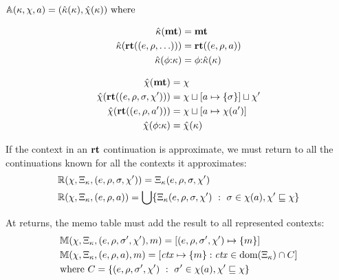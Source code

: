 \newcommand{\replacectx}{\hat\mkont} %
\newcommand{\addstore}{\hat\mmktab} %
\begin{center}
  $\approximate(\mkont, \mmktab, \maddr) = (\replacectx(\mkont), \addstore(\mkont)) \text{ where}$\\
  \begin{minipage}{0.45\linewidth}
    \begin{align*}
      \replacectx(\kmt) &= \kmt \\
      \replacectx(\krt{(\mexpr,\menv,\ldots)}) &= \krt{(\mexpr,\menv,\maddr)} \\
      \replacectx(\kcons{\mkframe}{\mkont}) &=
      \kcons{\mkframe}{\replacectx(\mkont)}
    \end{align*}
  \end{minipage}
  \begin{minipage}{0.50\linewidth}
    \begin{align*}
      \addstore(\kmt) &= \mmktab \\
      \addstore(\krt{(\mexpr,\menv,\mstore,\mmktab')}) &= \joinone{\mmktab}{\maddr}{\mstore}\sqcup \mmktab' \\
      \addstore(\krt{(\mexpr,\menv,\maddr')}) &= \joinm{\mmktab}{\maddr}{\mmktab(\maddr')} \\
      \addstore(\kcons{\mkframe}{\mkont}) &= \addstore(\mkont)
    \end{align*}
  \end{minipage}
\end{center}
%
If the context in an $\mathbf{rt}$ continuation is approximate, we must return to all the continuations known for all the contexts it approximates:
\begin{align*}
  &{\mathbb R}(\chi, \Xi_\kappa, (e,\rho, \sigma, \chi')) = \Xi_\kappa(e,\rho, \sigma, \chi') \\
  &{\mathbb R}(\chi, \Xi_\kappa, (e,\rho, a)) =
    \bigcup\{ \Xi_\kappa(e,\rho,\sigma,\chi')\ :\ \sigma \in \chi(a), \chi' \sqsubseteq \chi\}
\end{align*}

At returns, the memo table must add the result to all represented contexts:
\newcommand{\res}{m}
\begin{align*}
  &\memoize(\mmktab, \mktab_\mkont, (\mexpr,\menv, \mstore', \mmktab'), \res) =
  [(\mexpr,\menv, \mstore',\mmktab') \mapsto \set{{\res}}] \\
  &\memoize(\mmktab, \mktab_\mkont, (\mexpr,\menv, \maddr), \res) = [\mctx \mapsto \set{\res} : \mctx \in \dom(\mktab_\mkont) \cap C] \\
  &\text{where } C = \setbuild{(\mexpr,\menv, \mstore', \mmktab')}{\mstore' \in \mmktab(\maddr), \mmktab' \sqsubseteq \mmktab}
\end{align*}

